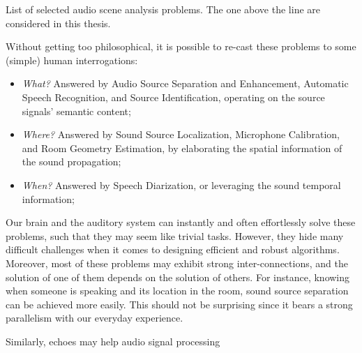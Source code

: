 \begin{table}[!h]

    \begin{fullwidth}
    \centering
    \small

    
    \caption{List of selected audio scene analysis problems. The one above the line are considered in this thesis.}
    \label{tab:processing:problems}

    \end{fullwidth}

\end{table}

\mynewline
Without getting too philosophical, it is possible to re-cast these problems to some (simple) human interrogations:
\begin{itemize}
    \item  \textit{What?} Answered by Audio Source Separation and Enhancement, Automatic Speech Recognition, and Source Identification, operating on the source signals' semantic content;
    \item  \textit{Where?} Answered by Sound Source Localization, Microphone Calibration, and Room Geometry Estimation, by elaborating the spatial information of the sound propagation;
    \item  \textit{When?} Answered by Speech Diarization, or leveraging the sound temporal information;
\end{itemize}

Our
brain and the auditory system can instantly and often effortlessly solve these problems, such that they may seem like trivial tasks.
However, they hide many difficult challenges when it comes to designing efficient and robust algorithms.
Moreover, most of these problems may exhibit strong inter-connections, and the solution of one of them depends on the solution of others.
For instance, knowing when someone is speaking and its location in the room, sound source separation can be achieved more easily.
This should not be surprising since it bears a strong parallelism with our everyday experience.

\mynewline
Similarly, echoes may help audio signal processing

